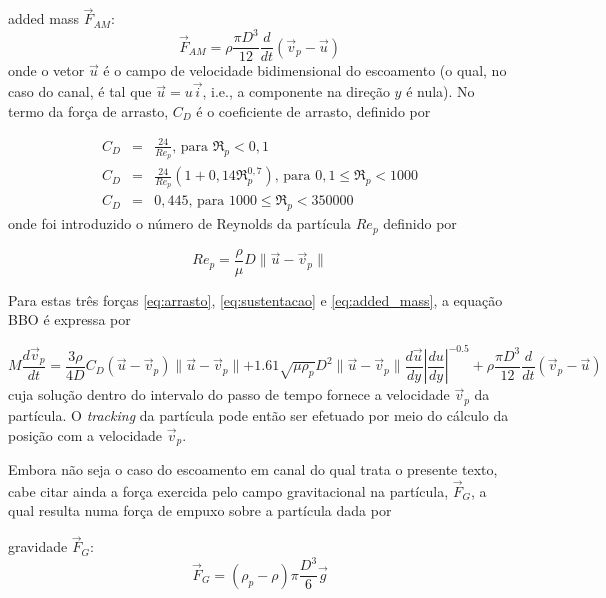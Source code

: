 added mass $\vec{F}_{AM}$:
\begin{equation}
\vec{F}_{AM} = \rho\frac{\pi D^3}{12}\frac{d}{dt}(\vec{v}_p-\vec{u})
\label{eq:added_mass}
\end{equation}
onde o vetor $\vec{u}$ é o campo de velocidade bidimensional do escoamento (o qual, no caso do canal, é tal que $\vec{u}=u\vec{i}$, i.e., a componente na direção $y$ é nula). No termo da força de arrasto, $C_D$ é o coeficiente de arrasto, definido por \cite{PERRY99}

\begin{eqnarray}
	C_D &=& \frac{24}{Re_p}\text{, para }\Re_p< 0,1\nonumber\\
	C_D &=& \frac{24}{Re_p}\left(1+0,14\Re_p^{0,7}\right)\text{, para }0,1\leq\Re_p< 1000\\
	C_D &=& 0,445\text{, para }1000\leq\Re_p< 350000\nonumber
\end{eqnarray}
onde foi introduzido o número de Reynolds da partícula $Re_p$ definido por

\begin{equation}
	Re_p = \frac{\rho}{\mu}D\parallel\vec{u}-\vec{v}_p\parallel
\end{equation}

Para estas três forças \ref{eq:arrasto}, \ref{eq:sustentacao} e \ref{eq:added_mass}, a equação BBO é expressa por

\begin{equation}
	M\frac{d\vec{v}_p}{dt} = 
	\frac{3\rho}{4D}C_D(\vec{u}-\vec{v}_p)\parallel\vec{u}-\vec{v}_p\parallel
	+1.61\sqrt{\mu\rho_p}D^2\parallel\vec{u}-\vec{v}_p\parallel\frac{d\vec{u}}{dy}\left|\frac{du}{dy}\right|^{-0.5}
	+\rho\frac{\pi D^3}{12}\frac{d}{dt}(\vec{v}_p-\vec{u})
\end{equation}
cuja solução dentro do intervalo do passo de tempo fornece a velocidade $\vec{v}_p$ da partícula. O {\it tracking} da partícula pode então ser efetuado por meio do cálculo da posição com a velocidade $\vec{v}_p$.

Embora não seja o caso do escoamento em canal do qual trata o presente texto, cabe citar ainda a força exercida pelo campo gravitacional na partícula, $\vec{F}_G$, a qual resulta numa força de empuxo sobre a partícula dada por

gravidade $\vec{F}_G$:
\begin{equation}
	\vec{F}_G = (\rho_p-\rho)\pi\frac{D^3}{6}\vec{g}
\end{equation}

